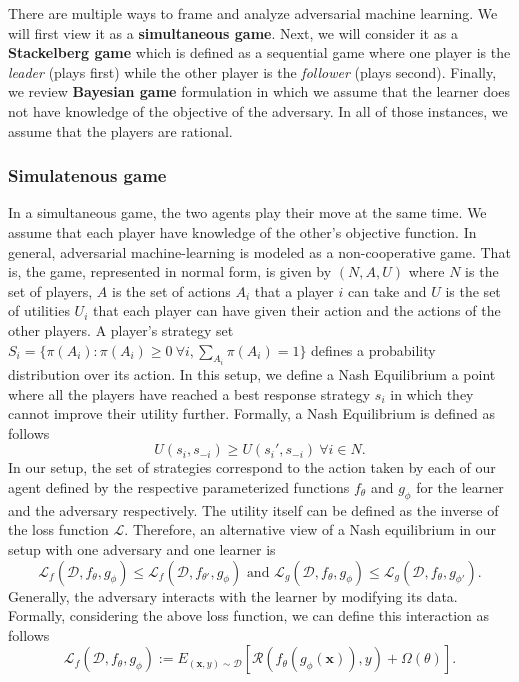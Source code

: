 There are multiple ways to frame and analyze adversarial machine learning. We will first view it as a \textbf{simultaneous game}. Next, we will consider it as a \textbf{Stackelberg game} which is defined as a sequential game where one player is the \textit{leader} (plays first) while the other player is the \textit{follower} (plays second). Finally, we review \textbf{Bayesian game} formulation in which we assume that the learner does not have knowledge of the objective of the adversary. In all of those instances, we assume that the players are rational.
\subsubsection{Simulatenous game} 
In a simultaneous game, the two agents play their move at the same time. We assume that each player have knowledge of the other's objective function. In general, adversarial machine-learning is modeled as a non-cooperative game. That is, the game, represented in normal form, is given by $(N, A, U)$ where $N$ is the set of players, $A$ is the set of actions $A_i$ that a player $i$ can take and $U$ is the set of utilities $U_i$ that each player can have given their action and the actions of the other players. A player's strategy set $S_i=\{\pi(A_i):\pi(A_i)\geq 0~\forall i, \sum_{A_i}\pi(A_i)=1\}$ defines a probability distribution over its action. In this setup, we define a Nash Equilibrium a point where all the players have reached a best response strategy $s_i$ in which they cannot improve their utility further. Formally, a Nash Equilibrium is defined as follows~\cite{roughgarden} \[U(s_i, s_{-i})\geq U(s_i',s_{-i})~\forall i\in N.\]
In our setup, the set of strategies correspond to the action taken by each of our agent defined by the respective parameterized functions $f_\theta$ and $g_\phi$ for the learner and the adversary respectively. The utility itself can be defined as the inverse of the loss function $\mathcal{L}$. Therefore, an alternative view of a Nash equilibrium in our setup with one adversary and one learner is
\[
\mathcal{L}_f(\mathcal{D},f_\theta,g_\phi)\leq\mathcal{L}_f(\mathcal{D},f_{\theta'},g_\phi) \text{ and } \mathcal{L}_g(\mathcal{D},f_\theta,g_\phi)\leq\mathcal{L}_g(\mathcal{D},f_\theta,g_{\phi'}).
\]
Generally, the adversary interacts with the learner by modifying its data. Formally, considering the above loss function, we can define this interaction as follows
\[
    \mathcal{L}_f(\mathcal{D},f_\theta,g_\phi):= E_{(\bm x, y)\sim\mathcal D}\left[\mathcal{R}(f_\theta(g_\phi(\bm x)), y) + \Omega(\theta)\right].
\]


